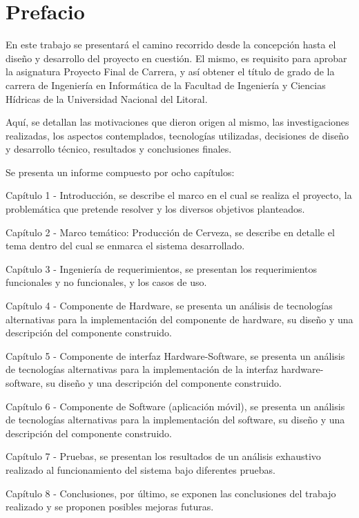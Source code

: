 \chapter{Prefacio}
\par
En este trabajo se presentará el camino recorrido desde la concepción hasta el diseño y desarrollo del proyecto en cuestión. El mismo, es requisito para aprobar la asignatura Proyecto Final de Carrera, y así obtener el título de grado de la carrera de Ingeniería en Informática de la Facultad de Ingeniería y Ciencias Hídricas de la Universidad Nacional del Litoral.
\par
Aquí, se detallan las motivaciones que dieron origen al mismo, las investigaciones realizadas, los aspectos contemplados, tecnologías utilizadas, decisiones de diseño y desarrollo técnico, resultados y conclusiones finales.
\par
Se presenta un informe compuesto por ocho capítulos:
\par
Capítulo 1 - Introducción, se describe el marco en el cual se realiza el proyecto, la problemática que pretende resolver y los diversos objetivos planteados.
\par
Capítulo 2 - Marco temático: Producción de Cerveza, se describe en detalle el tema dentro del cual se enmarca el sistema desarrollado.
\par
Capítulo 3 - Ingeniería de requerimientos, se presentan los requerimientos funcionales y no funcionales, y los casos de uso.
\par
Capítulo 4 - Componente de Hardware, se presenta un análisis de tecnologías alternativas para la implementación del componente de hardware, su diseño y una descripción del componente construido.
\par
Capítulo 5 - Componente de interfaz Hardware-Software, se presenta un análisis de tecnologías alternativas para la implementación de la interfaz hardware-software, su diseño y una descripción del componente construido.
\par
Capítulo 6 - Componente de Software (aplicación móvil), se presenta un análisis de tecnologías alternativas para la implementación del software, su diseño y una descripción del componente construido.
\par
Capítulo 7 - Pruebas, se presentan los resultados de un análisis exhaustivo realizado al funcionamiento del sistema bajo diferentes pruebas.
\par
Capítulo 8 - Conclusiones, por último, se exponen las conclusiones del trabajo realizado y se proponen posibles mejoras futuras.
